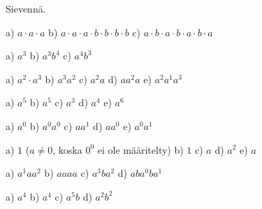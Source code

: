     
    
    
    Sievennä.
    \begin{tehtava}
        a) $a\cdot a\cdot a$ \quad
        b) $a\cdot a\cdot a\cdot b\cdot b\cdot b\cdot b$ \quad
        c) $a\cdot b\cdot a\cdot b\cdot a\cdot b\cdot a$
        
        \begin{vastaus}
            a) $a^3$ \qquad
            b) $a^3b^4$ \qquad
            c) $a^4b^3$
        \end{vastaus}
    \end{tehtava}
    
    \begin{tehtava}
        a) $a^2\cdot a^3$ \qquad
        b) $a^3a^2$ \qquad
        c) $a^2 a$ \qquad
        d) $a a^2 a$ \qquad
        e) $a^2a^1a^3$
        
        \begin{vastaus}
            a) $a^5$ \qquad
            b) $a^5$ \qquad
            c) $a^3$ \qquad
            d) $a^4$ \qquad
            e) $a^6$
        \end{vastaus}
    \end{tehtava}
    
    \begin{tehtava}
        a) $a^0$ \qquad
        b) $a^0a^0$ \qquad
        c) $a a^1$ \qquad
        d) $aa^0$ \qquad
        e) $a^0a^1$
        
        \begin{vastaus}
            a) $1$ \quad ($a\neq0$, koska $0^0$ ei ole määritelty) \qquad
            b) $1$ \qquad
            c) $a$ \qquad
            d) $a^2$ \qquad
            e) $a$
        \end{vastaus}
    \end{tehtava}
    
    \begin{tehtava}
        a) $a^1 a a^2$ \qquad
        b) $aaaa$ \qquad
        c) $a^3ba^2$ \qquad
        d) $aba^0ba^1$
        
        \begin{vastaus}
            a) $ a^4$ \qquad
            b) $a^4$ \qquad
            c) $a^5b$ \qquad
            d) $a^2b^2$
        \end{vastaus}
    \end{tehtava}
    
